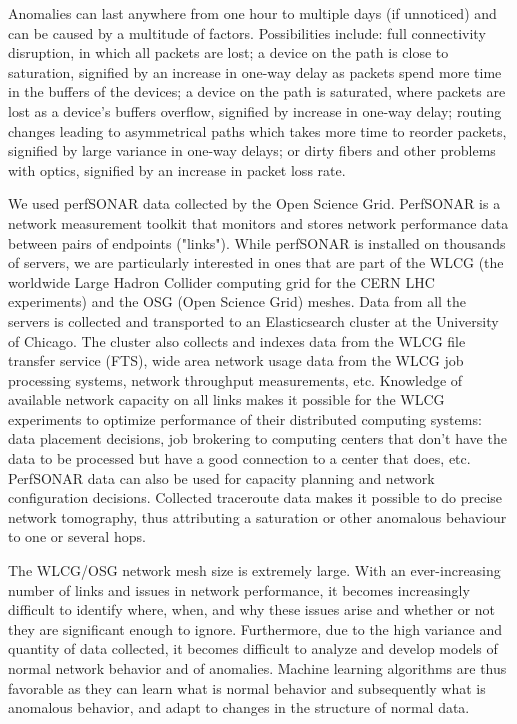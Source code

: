 \documentclass[5p]{elsarticle}
\begin{document}
Anomalies can last anywhere from one hour to multiple days (if unnoticed) and can be caused by a multitude of factors. Possibilities include: full connectivity disruption, in which all packets are lost; a device on the path is close to saturation, signified by an increase in one-way delay as packets spend more time in the buffers of the devices; a device on the path is saturated, where packets are lost as a device’s buffers overflow, signified by increase in one-way delay; routing changes leading to asymmetrical paths which takes more time to reorder packets, signified by large variance in one-way delays; or dirty fibers and other problems with optics, signified by an increase in packet loss rate.

We used perfSONAR \cite{one} data collected by the Open Science Grid. PerfSONAR is a network measurement to\-ol\-kit that monitors and stores network performance data between pairs of endpoints ("links"). While perfSONAR is installed on thousands of servers, we are particularly  interested in ones that are part of the WLCG (the worldwide Large Hadron Collider computing grid for the CERN LHC experiments) and the OSG (Open Science Grid) meshes. Data from all the servers is collected and transported to an Elasticsearch cluster at the University of Chicago. The cluster also collects and indexes data from the WLCG file transfer service (FTS), wide area network usage data from the WLCG job processing systems, network throughput measurements, etc.  Knowledge of available network capacity on all links makes it possible for the WLCG experiments to optimize performance of their distributed computing systems: data placement decisions, job brokering to computing centers that don't have the data to be processed but have a good connection to a center that does, etc. PerfSONAR data can also be used for capacity planning and network configuration decisions. Collected traceroute data makes it possible to do precise network tomography, thus attributing a saturation or other anomalous behaviour to one or several hops.   

The WLCG/OSG network mesh size is extremely large. With an ever-increasing number of links and issues in network performance, it becomes increasingly difficult to identify where, when, and why these issues arise and whe\-ther or not they are significant enough to ignore. Fur\-ther\-mo\-re, due to the high variance and quantity of data collected, it becomes difficult to analyze and develop models of normal network behavior and of anomalies. Machine learning algorithms are thus favorable as they can learn what is normal behavior and subsequently what is anomalous behavior, and adapt to changes in the structure of normal data.
\end{document}
